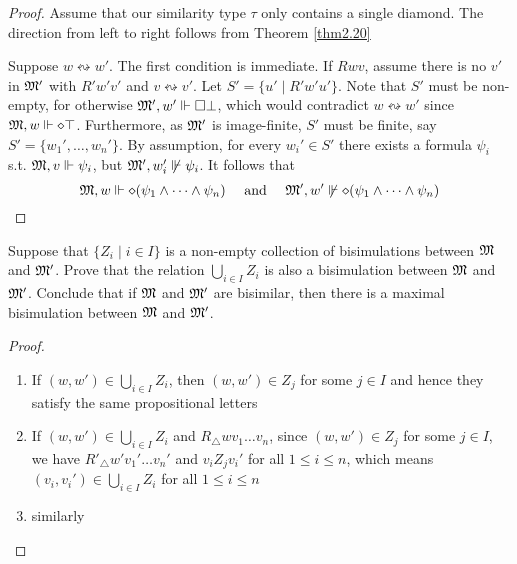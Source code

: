 \documentclass[11pt]{article}
\begin{document}
\begin{proof}
Assume that our similarity type \(\tau\) only contains a single diamond. The
direction from left to right follows from Theorem \ref{thm2.20}

Suppose \(w\leftrightsquigarrow w'\). The first condition is immediate. If
\(Rwv\), assume there is no \(v'\) in \(\mathfrak{M}'\) with \(R'w'v'\) and
\(v\leftrightsquigarrow v'\). Let \(S'=\{u'\mid R'w'u'\}\). Note that \(S'\)
must be non-empty, for otherwise \(\mathfrak{M}',w'\Vdash\Box\bot\), which would
contradict \(w\leftrightsquigarrow w'\) since \(\mathfrak{M},w\Vdash\diamond\top\).
Furthermore, as \(\mathfrak{M}'\) is image-finite, \(S'\) must be finite, say
\(S'=\{w_1',\dots,w_n'\}\). By assumption, for every \(w_i'\in S'\) there
exists a formula \(\psi_i\) s.t. \(\mathfrak{M},v\Vdash\psi_i\), but
\(\mathfrak{M}',w_i'\not\Vdash\psi_i\). It follows that
\begin{equation*}
\mathfrak{M},w\Vdash\diamond(\psi_1\wedge\dots\wedge\psi_n)\quad\text{ and }\quad
\mathfrak{M}',w'\not\Vdash\diamond(\psi_1\wedge\dots\wedge \psi_n)
\end{equation*}
\end{proof}

\begin{exercise}
\label{ex2.2.8}
Suppose that \(\{Z_i\mid i\in I\}\) is a non-empty collection of
bisimulations between \(\mathfrak{M}\) and \(\mathfrak{M}'\). Prove that the relation
\(\bigcup_{i\in I}Z_i\) is also a bisimulation between \(\mathfrak{M}\) and \(\mathfrak{M}'\).
Conclude that if \(\mathfrak{M}\) and \(\mathfrak{M}'\) are bisimilar, then there is a maximal
bisimulation between \(\mathfrak{M}\) and \(\mathfrak{M}'\).
\end{exercise}

\begin{proof}
\begin{enumerate}
\item If \((w,w')\in\bigcup_{i\in I}Z_i\), then \((w,w')\in Z_j\) for some
\(j\in I\) and hence they satisfy the same propositional letters
\item If \((w,w')\in\bigcup_{i\in I}Z_i\) and \(R_{\triangle}wv_1\dots v_n\),
since \((w,w')\in Z_j\) for some \(j\in I\), we have
\(R'_{\triangle}w'v_1'\dots v_n'\) and \(v_iZ_jv_i'\) for all \(1\le i\le
      n\), which means \((v_i,v_i')\in\bigcup_{i\in I}Z_i\) for all \(1\le i\le n\)
\item similarly
\end{enumerate}
\end{proof}
\end{document}
